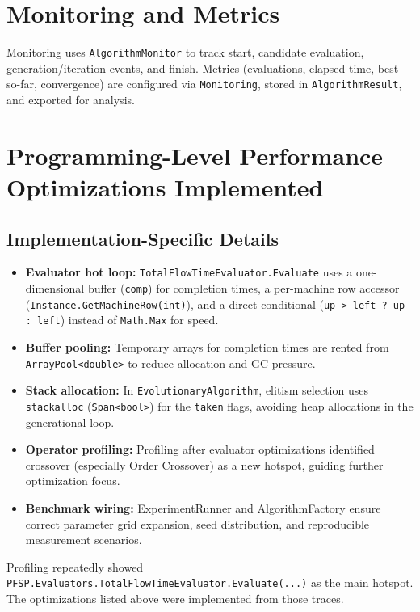 \documentclass[12pt,a4paper]{report}
\begin{document}
\section{Monitoring and Metrics}
Monitoring uses \texttt{AlgorithmMonitor} to track start, candidate evaluation, generation/iteration events, and finish. Metrics (evaluations, elapsed time, best-so-far, convergence) are configured via \texttt{Monitoring}, stored in \texttt{AlgorithmResult}, and exported for analysis.


\section{Programming-Level Performance Optimizations Implemented}

\subsection*{Implementation-Specific Details}
\begin{itemize}
    \item \textbf{Evaluator hot loop:} \texttt{TotalFlowTimeEvaluator.Evaluate} uses a one-dimensional buffer (\texttt{comp}) for completion times, a per-machine row accessor (\texttt{Instance.GetMachineRow(int)}), and a direct conditional (\texttt{up > left ? up : left}) instead of \texttt{Math.Max} for speed.
    \item \textbf{Buffer pooling:} Temporary arrays for completion times are rented from \texttt{ArrayPool<double>} to reduce allocation and GC pressure.
    \item \textbf{Stack allocation:} In \texttt{EvolutionaryAlgorithm}, elitism selection uses \texttt{stackalloc} (\texttt{Span<bool>}) for the \texttt{taken} flags, avoiding heap allocations in the generational loop.
    \item \textbf{Operator profiling:} Profiling after evaluator optimizations identified crossover (especially Order Crossover) as a new hotspot, guiding further optimization focus.
    \item \textbf{Benchmark wiring:} ExperimentRunner and AlgorithmFactory ensure correct parameter grid expansion, seed distribution, and reproducible measurement scenarios.
\end{itemize}
Profiling repeatedly showed
\texttt{PFSP.Evaluators.TotalFlowTimeEvaluator.Evaluate(...)} as the main hotspot. The optimizations listed above were implemented from those traces.
\end{document}
